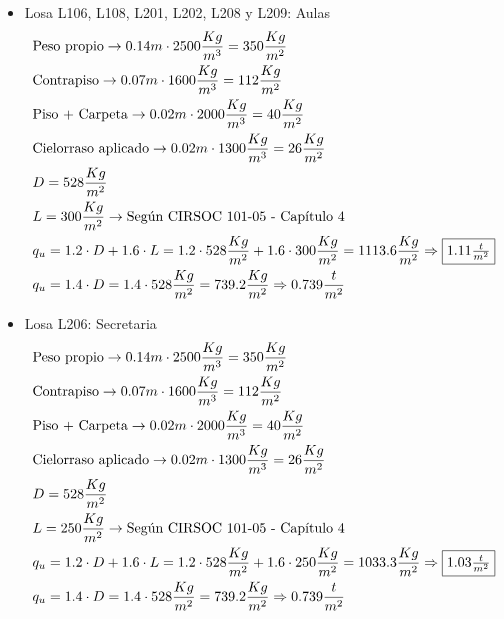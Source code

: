 \begin{enumerate}
\begin{itemize}
\item Losa L106, L108, L201, L202, L208 y L209: Aulas
\begin{align*}
& \text{Peso propio} \rightarrow 0.14m \cdot 2500 \frac{Kg}{m^3} = 350 \frac{Kg}{m^2}\\
& \text{Contrapiso} \rightarrow 0.07m \cdot 1600 \frac{Kg}{m^3} = 112 \frac{Kg}{m^2}\\
& \text{Piso + Carpeta} \rightarrow 0.02m \cdot 2000 \frac{Kg}{m^3} = 40 \frac{Kg}{m^2}\\
& \text{Cielorraso aplicado} \rightarrow  0.02m \cdot 1300 \frac{Kg}{m^3} = 26 \frac{Kg}{m^2}\\
& D = 528 \frac{Kg}{m^2}\\
& L = 300 \frac{Kg}{m^2} \rightarrow \text{Según CIRSOC 101-05 - Capítulo 4}\\
& q_u = 1.2 \cdot D + 1.6 \cdot L = 1.2 \cdot 528 \frac{Kg}{m^2} + 1.6 \cdot 300 \frac{Kg}{m^2} = 1113.6 \frac{Kg}{m^2} \Rightarrow \framebox{$1.11 \frac{t}{m^2}$} \\
& q_u = 1.4 \cdot D = 1.4 \cdot 528 \frac{Kg}{m^2} = 739.2 \frac{Kg}{m^2} \Rightarrow 0.739 \frac{t}{m^2}
\end{align*}

\item Losa L206: Secretaria
\begin{align*}
& \text{Peso propio} \rightarrow 0.14m \cdot 2500 \frac{Kg}{m^3} = 350 \frac{Kg}{m^2}\\
& \text{Contrapiso} \rightarrow 0.07m \cdot 1600 \frac{Kg}{m^3} = 112 \frac{Kg}{m^2}\\
& \text{Piso + Carpeta} \rightarrow 0.02m \cdot 2000 \frac{Kg}{m^3} = 40 \frac{Kg}{m^2}\\
& \text{Cielorraso aplicado} \rightarrow  0.02m \cdot 1300 \frac{Kg}{m^3} = 26 \frac{Kg}{m^2}\\
& D = 528 \frac{Kg}{m^2}\\
& L = 250 \frac{Kg}{m^2} \rightarrow \text{Según CIRSOC 101-05 - Capítulo 4}\\
& q_u = 1.2 \cdot D + 1.6 \cdot L = 1.2 \cdot 528 \frac{Kg}{m^2} + 1.6 \cdot 250 \frac{Kg}{m^2} = 1033.3 \frac{Kg}{m^2} \Rightarrow \framebox{$1.03 \frac{t}{m^2}$} \\
& q_u = 1.4 \cdot D = 1.4 \cdot 528 \frac{Kg}{m^2} = 739.2 \frac{Kg}{m^2} \Rightarrow 0.739 \frac{t}{m^2}
\end{align*}


\end{itemize}
\end{enumerate}
